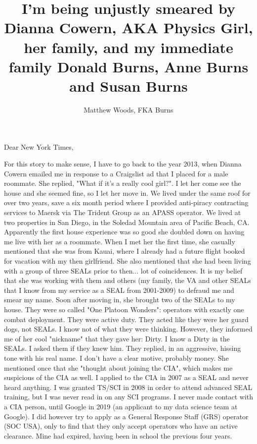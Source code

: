 \documentclass[a4paper]{arthur-letter}
\title{I'm being unjustly smeared by Dianna Cowern, AKA Physics Girl, her family, and my immediate family Donald Burns, Anne Burns and Susan Burns}
\author{Matthew Woods, FKA Burns}
\begin{document}
    \makeprofile %
    
    \address{Matthew Woods,\\PO Box 376\\Mountain View, CA, 94042}

    \begin{letter}

            \subject{TLDR: I'm a former Navy SEAL, smeared by Dianna Cowern (AKA Physics Girl) via Alphabet Inc while working as a Google employee. From 2015-2020, I have experienced severe police misconduct first hand. I think they may have ties to the Nazis, since my entire immediate family (Donald Burns, Anne Burns and Susan Burns) are Nazis... the type that agree with Adolf Hitler of WWII. They lied to me about this since I was born.}

            \opening{Dear New York Times,}

            For this story to make sense, I have to go back to the year 2013, when Dianna Cowern emailed me in response to a Craigslist ad that I placed for a male roommate. She replied, "What if it's a really cool girl?". I let her come see the house and she seemed fine, so I let her move in. We lived under the same roof for over two years, save a six month period where I provided anti-piracy contracting services to Maersk via The Trident Group as an APASS operator. We lived at two properties in San Diego, in the Soledad Mountain area of Pacific Beach, CA. Apparently the first house experience was so good she doubled down on having me live with her as a roommate. When I met her the first time, she casually mentioned that she was from Kauai, where I already had a future flight booked for vacation with my then girlfriend. She also mentioned that she had been living with a group of three SEALs prior to then... lot of coincidences. It is my belief that she was working with them and others (my family, the VA and other SEALs that I know from my service as a SEAL from 2001-2009) to defraud me and smear my name. Soon after moving in, she brought two of the SEALs to my house. They were so called "One Platoon Wonders": operators with exactly one combat deployment. They were active duty. They acted like they were her guard dogs, not SEALs. I know not of what they were thinking. However, they informed me of her cool "nickname" that they gave her: Dirty. I know a Dirty in the SEALs. I asked them if they knew him. They replied, in an aggressive, hissing tone with his real name. I don't have a clear motive, probably money. She mentioned once that she "thought about joining the CIA", which makes me suspicious of the CIA as well. I applied to the CIA in 2007 as a SEAL and never heard anything. I was granted TS/SCI in 2008 in order to attend advanced SEAL training, but I was never read in on any SCI programs. I never made contact with a CIA person, until Google in 2019 (an applicant to my data science team at Google). I did however try to apply as a General Response Staff (GRS) operator (SOC USA), only to find that they only accept operators who have an active clearance. Mine had expired, having been in school the previous four years. \\ 
            

\end{letter}
\end{document}
